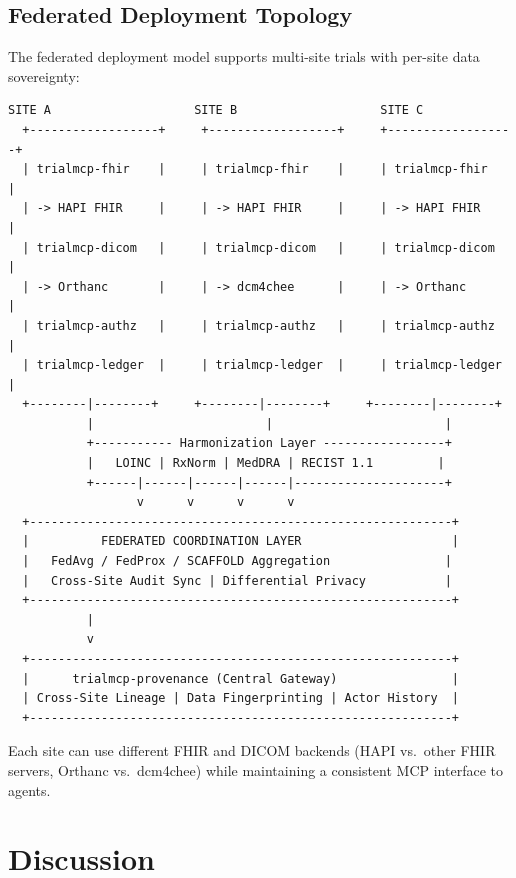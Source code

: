 \documentclass[10pt,letterpaper]{article}
\begin{document}
\subsection{Federated Deployment Topology}

The federated deployment model supports multi-site trials with per-site data sovereignty:

\begin{lstlisting}[title={\textbf{Federated Multi-Site Deployment with Data Harmonization}}]
       SITE A                    SITE B                    SITE C
  +------------------+     +------------------+     +------------------+
  | trialmcp-fhir    |     | trialmcp-fhir    |     | trialmcp-fhir    |
  | -> HAPI FHIR     |     | -> HAPI FHIR     |     | -> HAPI FHIR     |
  | trialmcp-dicom   |     | trialmcp-dicom   |     | trialmcp-dicom   |
  | -> Orthanc       |     | -> dcm4chee      |     | -> Orthanc       |
  | trialmcp-authz   |     | trialmcp-authz   |     | trialmcp-authz   |
  | trialmcp-ledger  |     | trialmcp-ledger  |     | trialmcp-ledger  |
  +--------|--------+     +--------|--------+     +--------|--------+
           |                        |                        |
           +----------- Harmonization Layer -----------------+
           |   LOINC | RxNorm | MedDRA | RECIST 1.1         |
           +------|------|------|------|---------------------+
                  v      v      v      v
  +-----------------------------------------------------------+
  |          FEDERATED COORDINATION LAYER                     |
  |   FedAvg / FedProx / SCAFFOLD Aggregation                |
  |   Cross-Site Audit Sync | Differential Privacy           |
  +-----------------------------------------------------------+
           |
           v
  +-----------------------------------------------------------+
  |      trialmcp-provenance (Central Gateway)                |
  | Cross-Site Lineage | Data Fingerprinting | Actor History  |
  +-----------------------------------------------------------+
\end{lstlisting}

Each site can use different FHIR and DICOM backends (HAPI vs.\ other FHIR servers, Orthanc vs.\ dcm4chee) while maintaining a consistent MCP interface to agents.

\section{Discussion}
\end{document}
